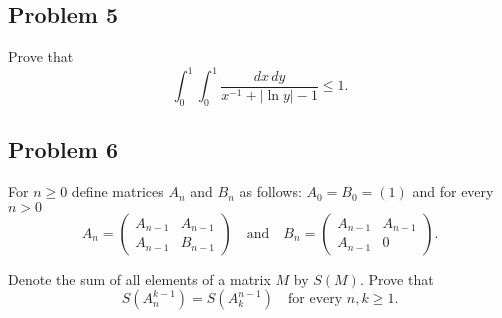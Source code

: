 \documentclass{article}
\begin{document}
\subsection*{Problem 5}
Prove that
\[
\int_0^1 \int_0^1 \frac{dx\,dy}{x^{-1} + |\ln y| - 1} \leq 1.
\]

\subsection*{Problem 6}
For $n \geq 0$ define matrices $A_n$ and $B_n$ as follows: $A_0 = B_0 = (1)$ and for every $n > 0$
\[
A_n = \begin{pmatrix}
A_{n-1} & A_{n-1} \\
A_{n-1} & B_{n-1}
\end{pmatrix}
\quad \text{and} \quad
B_n = \begin{pmatrix}
A_{n-1} & A_{n-1} \\
A_{n-1} & 0
\end{pmatrix}.
\]

Denote the sum of all elements of a matrix $M$ by $S(M)$. Prove that
\[
S(A_n^{k-1}) = S(A_k^{n-1}) \quad \text{for every } n, k \geq 1.
\]
\end{document}

